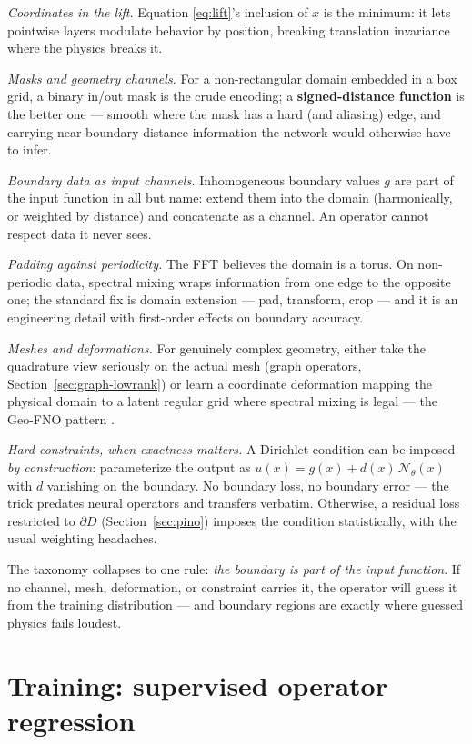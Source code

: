 \documentclass[10pt,a4paper]{article}
\begin{document}
\emph{Coordinates in the lift.} Equation \eqref{eq:lift}'s inclusion of
$x$ is the minimum: it lets pointwise layers modulate behavior by
position, breaking translation invariance where the physics breaks it.

\emph{Masks and geometry channels.} For a non-rectangular domain embedded
in a box grid, a binary in/out mask is the crude encoding; a
\textbf{signed-distance function} is the better one --- smooth where the
mask has a hard (and aliasing) edge, and carrying near-boundary distance
information the network would otherwise have to infer.

\emph{Boundary data as input channels.} Inhomogeneous boundary values $g$
are part of the input function in all but name: extend them into the
domain (harmonically, or weighted by distance) and concatenate as a
channel. An operator cannot respect data it never sees.

\emph{Padding against periodicity.} The FFT believes the domain is a
torus. On non-periodic data, spectral mixing wraps information from one
edge to the opposite one; the standard fix is domain extension --- pad,
transform, crop --- and it is an engineering detail with first-order
effects on boundary accuracy.

\emph{Meshes and deformations.} For genuinely complex geometry, either
take the quadrature view seriously on the actual mesh (graph operators,
Section~\ref{sec:graph-lowrank}) or learn a coordinate deformation
mapping the physical domain to a latent regular grid where spectral
mixing is legal --- the Geo-FNO pattern \cite{geofno}.

\emph{Hard constraints, when exactness matters.} A Dirichlet condition
can be imposed \emph{by construction}: parameterize the output as
$u(x) = g(x) + d(x)\,\mathcal{N}_\theta(x)$ with $d$ vanishing on the
boundary. No boundary loss, no boundary error --- the trick predates
neural operators and transfers verbatim. Otherwise, a residual loss
restricted to $\partial D$ (Section~\ref{sec:pino}) imposes the condition
statistically, with the usual weighting headaches.

The taxonomy collapses to one rule: \emph{the boundary is part of the
input function}. If no channel, mesh, deformation, or constraint carries
it, the operator will guess it from the training distribution --- and
boundary regions are exactly where guessed physics fails loudest.

\section{Training: supervised operator regression}
\label{sec:training}
\end{document}
